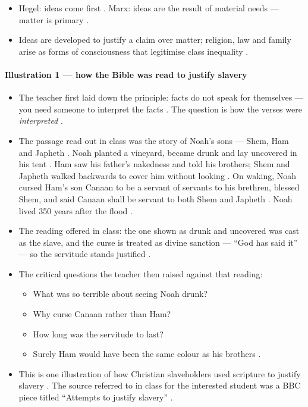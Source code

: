 \begin{KeyConcept}
\begin{itemize}
    \item Hegel: ideas come first . Marx: ideas are the result of material needs --- matter is primary .
    \item Ideas are developed to justify a claim over matter; religion, law and family arise as forms of consciousness that legitimise class inequality .
\end{itemize}
\end{KeyConcept}

\paragraph{Illustration 1 --- how the Bible was read to justify slavery}
\begin{itemize}
    \item The teacher first laid down the principle: facts do not speak for themselves --- you need someone to interpret the facts . The question is how the verses were \emph{interpreted} .
    \item The passage read out in class was the story of Noah's sons --- Shem, Ham and Japheth . Noah planted a vineyard, became drunk and lay uncovered in his tent . Ham saw his father's nakedness and told his brothers; Shem and Japheth walked backwards to cover him without looking . On waking, Noah cursed Ham's son Canaan to be a servant of servants to his brethren, blessed Shem, and said Canaan shall be servant to both Shem and Japheth . Noah lived 350 years after the flood .
    \item The reading offered in class: the one shown as drunk and uncovered was cast as the slave, and the curse is treated as divine sanction --- ``God has said it'' --- so the servitude stands justified .
    \item The critical questions the teacher then raised against that reading:
    \begin{itemize}
        \item What was so terrible about seeing Noah drunk? 
        \item Why curse Canaan rather than Ham? 
        \item How long was the servitude to last? 
        \item Surely Ham would have been the same colour as his brothers .
    \end{itemize}
    \item This is one illustration of how Christian slaveholders used scripture to justify slavery . The source referred to in class for the interested student was a BBC piece titled ``Attempts to justify slavery'' .
\end{itemize}

